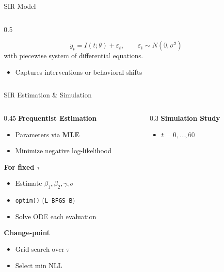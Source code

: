 \documentclass[
  ignorenonframetext,
  aspectratio=169,
]{beamer}
\providecommand{\tightlist}{%
  \setlength{\itemsep}{0pt}\setlength{\parskip}{0pt}}\usepackage{longtable,booktabs,array}
\begin{document}
\begin{frame}{SIR Model}
\begin{columns}[T]
\begin{column}{0.5\textwidth}
\vspace{-8pt}

\[
y_t = I(t;\theta) + \varepsilon_t, \qquad \varepsilon_t \sim N(0,\sigma^2)
\] with piecewise system of differential equations.

\begin{itemize}
\tightlist
\item
  Captures interventions or behavioral shifts
\end{itemize}
\end{column}
\end{columns}
\end{frame}

\begin{frame}[fragile]{SIR Estimation \& Simulation}
\label{sir-estimation-simulation}
\begin{columns}[T]
\begin{column}{0.45\textwidth}
\textbf{Frequentist Estimation}

\begin{itemize}
\tightlist
\item
  Parameters via \textbf{MLE}\\
\item
  Minimize negative log-likelihood
\end{itemize}

\textbf{For fixed \(\tau\)}

\begin{itemize}
\tightlist
\item
  Estimate \(\beta_1, \beta_2, \gamma, \sigma\)\\
\item
  \texttt{optim()} (\texttt{L-BFGS-B})\\
\item
  Solve ODE each evaluation
\end{itemize}

\textbf{Change-point}

\begin{itemize}
\tightlist
\item
  Grid search over \(\tau\)\\
\item
  Select min NLL
\end{itemize}
\end{column}

\begin{column}{0.3\textwidth}
\textbf{Simulation Study}

\begin{itemize}
\tightlist
\item
  \(t = 0,\dots,60\)
\end{itemize}


\end{column}
\end{columns}
\end{frame}
\end{document}
